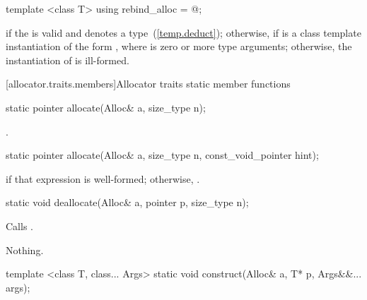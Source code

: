 %
\begin{itemdecl}
template <class T> using rebind_alloc = @\seebelow@;
\end{itemdecl}

\begin{itemdescr}
\pnum
\templalias {} if
the   is valid and denotes a
type~(\ref{temp.deduct}); otherwise,
 if  is a class template instantiation
of the form , where  is zero or more type arguments;
otherwise, the instantiation of  is ill-formed.
\end{itemdescr}

[allocator.traits.members]{Allocator traits static member functions}

%
\begin{itemdecl}
static pointer allocate(Alloc& a, size_type n);
\end{itemdecl}

\begin{itemdescr}
\pnum
\returns {}.
\end{itemdescr}

%
\begin{itemdecl}
static pointer allocate(Alloc& a, size_type n, const_void_pointer hint);
\end{itemdecl}

\begin{itemdescr}
\pnum
\returns {} if that expression is well-formed; otherwise, .
\end{itemdescr}

%
\begin{itemdecl}
static void deallocate(Alloc& a, pointer p, size_type n);
\end{itemdecl}

\begin{itemdescr}
\pnum
\effects Calls .

\pnum
\throws Nothing.
\end{itemdescr}

%
\begin{itemdecl}
template <class T, class... Args>
  static void construct(Alloc& a, T* p, Args&&... args);
\end{itemdecl}

